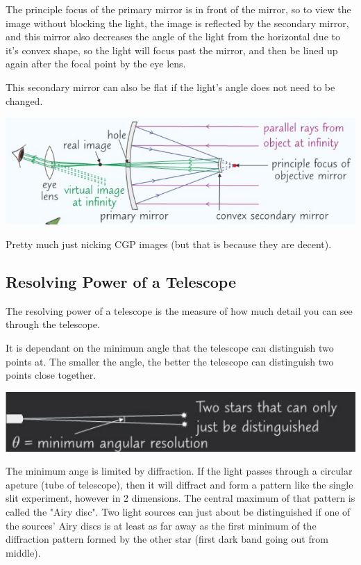 \documentclass[a4paper, 12pt]{article}
\begin{document}
The principle focus of the primary mirror is in front of the mirror, so to view the image without blocking the light, the image is reflected by the secondary mirror, and this mirror also decreases the angle of the light from the horizontal due to it's convex shape, so the light will focus past the mirror, and then be lined up again after the focal point by the eye lens.

This secondary mirror can also be flat if the light's angle does not need to be changed.

\includegraphics[width=\textwidth]{images/reflectingTele.png}

Pretty much just nicking CGP images (but that is because they are decent).

\subsection{Resolving Power of a Telescope}

The resolving power of a telescope is the measure of how much detail you can see through the telescope.

It is dependant on the minimum angle that the telescope can distinguish two points at. The smaller the angle, the better the telescope can distinguish two points close together.

\includegraphics[width=\textwidth]{images/angularResolution.png}

The minimum ange is limited by diffraction. If the light passes through a circular apeture (tube of telescope), then it will diffract and form a pattern like the single slit experiment, however in 2 dimensions. The central maximum of that pattern is called the "Airy disc". Two light sources can just about be distinguished if one of the sources' Airy discs is at least as far away as the first minimum of the diffraction pattern formed by the other star (first dark band going out from middle).
\end{document}
